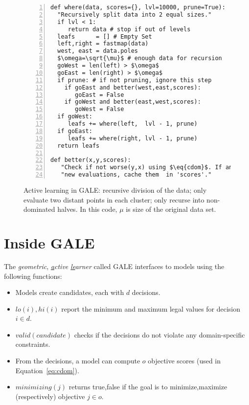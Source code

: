 \documentclass[10pt,journal,compsoc]{IEEEtran}
\newcommand{\eq}[1]{Equation~\ref{eq:#1}}
\newcommand{\bi}{\begin{itemize}}
\newcommand{\ei}{\end{itemize}}
\begin{document}
\begin{figure}[!b]
\begin{lstlisting}[mathescape,frame=l,numbers=left]
def where(data, scores={}, lvl=10000, prune=True):  
  "Recursively split data into 2 equal sizes."
  if lvl < 1: 
     return data # stop if out of levels
  leafs      = [] # Empty Set
  left,right = fastmap(data)
  west, east = data.poles
  $\omega=\sqrt{\mu}$ # enough data for recursion
  goWest = len(left) > $\omega$  
  goEast = len(right) > $\omega$ 
  if prune: # if not pruning, ignore this step
    if goEast and better(west,east,scores): 
       goEast = False 
    if goWest and better(east,west,scores): 
       goWest = False 
  if goWest:  
     leafs += where(left,  lvl - 1, prune)  
  if goEast:  
     leafs += where(right, lvl - 1, prune) 
  return leafs

def better(x,y,scores):
   "Check if not worse(y,x) using $\eq{cdom}$. If any"
   "new evaluations, cache them  in 'scores'."
\end{lstlisting}

\caption{Active learning in GALE:
recursive division of the data;
only evaluate two distant points in each cluster;
only recurse into non-dominated halves.
In this code, $\mu$ is size of the original data set.
}
\label{fig:whereCode}   
\end{figure}




\section{Inside GALE}
The  {\em \underline{g}eometric}, {\em \underline{a}ctive \underline{le}arner} called 
GALE interfaces to models using the following functions:
\bi
\item Models create candidates, each  with $d$ decisions. 
\item $\mathit{lo}(i), \mathit{hi}(i)$ report the minimum and maximum
legal values for decision $i\in d$.
\item $\mathit{valid}(\mathit{candidate})$ 
checks if the decisions
do not violate any domain-specific constraints.
\item  From the decisions,
a model can compute $o$  objective scores (used in \eq{cdom}).
\item $\mathit{minimizing}(j)$ returns true,false if the goal
is to minimize,maximize (respectively) objective $j \in o$.
\ei
\end{document}
